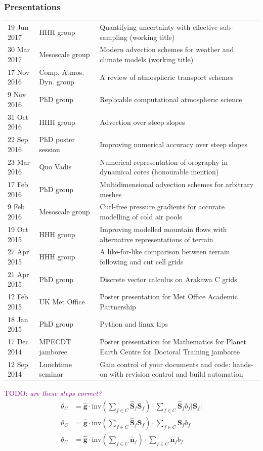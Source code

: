 \documentclass[a4paper,11pt]{article}
\newcommand{\TODO}[1]{\textcolor{purple}{TODO: \emph{#1}}}
\begin{document}
\subsubsection*{Presentations}
\begin{tabularx}{\linewidth}{l l X}
19 Jun 2017 & HHH group & Quantifying uncertainty with effective sub-sampling (working title) \\
30 Mar 2017 & Mesoscale group & Modern advection schemes for weather and climate models (working title) \\
17 Nov 2016 & Comp. Atmos. Dyn. group & A review of atmospheric transport schemes \\
9 Nov 2016 & PhD group & Replicable computational atmospheric science \\
31 Oct 2016 & HHH group & Advection over steep slopes \\
22 Sep 2016 & PhD poster session & Improving numerical accuracy over steep slopes \\
23 Mar 2016 & Quo Vadis & Numerical representation of orography in dynamical cores (honourable mention) \\
17 Feb 2016 & PhD group & Multidimensional advection schemes for arbitrary meshes \\
9 Feb 2016 & Mesoscale group & Curl-free pressure gradients for accurate modelling of cold air pools \\
19 Oct 2015 & HHH group & Improving modelled mountain flows with alternative representations of terrain \\
27 Apr 2015 & HHH group & A like-for-like comparison between terrain following and cut cell grids \\
21 Apr 2015 & PhD group & Discrete vector calculus on Arakawa C grids \\
12 Feb 2015 & UK Met Office & Poster presentation for Met Office Academic Partnership \\
18 Jan 2015 & PhD group & Python and linux tips \\
17 Dec 2014 & MPECDT jamboree & Poster presentation for Mathematics for Planet Earth Centre for Doctoral Training jamboree \\
12 Sep 2014 & Lunchtime seminar  & Gain control of your documents and code: hands-on with revision control and build automation \\
\end{tabularx}

\newpage

\TODO{are these steps correct?}
\begin{align*}
	\theta_C &= \mathbf{\hat{g}} \cdot \mathrm{inv} \left( \sum_{f \in C} \mathbf{\hat{S}}_f \mathbf{S}_f \right) \cdot \sum_{f \in C} \mathbf{\hat{S}}_f b_f \lvert \mathbf{S}_f \rvert \\
	\theta_C &= \mathbf{\hat{g}} \cdot \mathrm{inv} \left( \sum_{f \in C} \mathbf{\hat{S}}_f \mathbf{S}_f \right) \cdot \sum_{f \in C} \mathbf{S}_f b_f \\
	\theta_C &= \mathbf{\hat{g}} \cdot \mathrm{inv} \left( \sum_{f \in C} \mathbf{\hat{n}}_f \right) \cdot \sum_{f \in C} \mathbf{\hat{n}}_f b_f
\end{align*}
\end{document}

